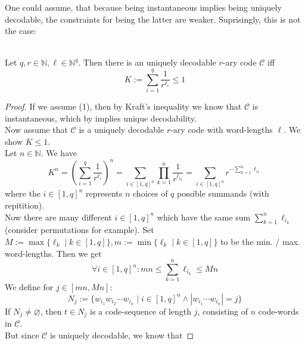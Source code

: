 \documentclass[12pt]{article}
\newenvironment{statement3}[3]{\begin{trivlist}
\item[\hskip \labelsep {\bfseries #1}\hskip \labelsep {\bfseries #2} {#3}\textbf{.}]}{\end{trivlist}}
\begin{document}
One could assume, that because being instantaneous implies being uniquely decodable, the constraints
for being the latter are weaker. Suprisingly, this is not the case:

\begin{statement3}{(1.8)}{Theorem}{(McMillan's Inequality)}\strut\\[2pt]
    Let $q,r \in \mathbb{N}, \ell \in \mathbb{N}^q$. Then there is an uniquely decodable
    $r$-ary code $\mathcal{C}$ iff
    \begin{equation}
        K := \sum_{i=1}^{q} \frac{1}{r^{\ell_i}} \leq 1 \tag{1}
    \end{equation}

    \begin{proof}
        If we assume (1), then by Kraft's inequality we know that $\mathcal{C}$
        is instantaneous, which by \cite{ICT} implies unique decodability.\\[10pt]
        Now assume that $\mathcal{C}$ is a uniquely decodable $r$-ary code with word-lengths
        $\ell$. We show $K \leq 1$. \\
        Let $n \in \mathbb{N}$. We have
        \begin{equation}
            K^n
            = \left(\sum_{i=1}^{q} \frac{1}{r^{\ell_i}}\right)^n
            = \sum_{i \in [1,q]^n}\prod_{k=1}^{n} \frac{1}{r^{\ell_{i_k}}}
            = \sum_{i \in [1,q]^n} r^{-\sum_{k=1}^{n} \ell_{i_k}} \tag{2}
        \end{equation}
        where the $i \in [1,q]^n$ represents $n$ choices of $q$ possible summands (with repitition).\\[10pt]
        Now there are many different $i \in [1,q]^n$ which have the same sum $\sum_{k=1}^{n} \ell_{i_k}$
        (consider permutations for example). Set $M := \max\{\ell_k\mid k \in [1,q]\}, m := \min\{\ell_k \mid k \in [1,q]\}$
        to be the min. / max. word-lengths.
        Then we get
        \begin{equation}
            \forall i \in [1,q]^n: mn \leq \sum_{k=1}^{n} \ell_{i_k} \leq Mn \tag{3}
        \end{equation}
        We define for
        $j \in [mn,Mn]$:
        $$
            N_{j} := \{w_{i_1}w_{i_2}\cdots w_{i_n} \mid i \in [1,q]^n \land |w_{i_1}\cdots w_{i_n}| = j \}
        $$
        If $N_j \neq \varnothing$, then $t \in N_{j}$ is a code-sequence of length $j$, consisting of $n$ code-words in $\mathcal{C}$.
        \\
        But since $\mathcal{C}$ is uniquely decodable, we know that

\end{proof}
\end{statement3}
\end{document}
